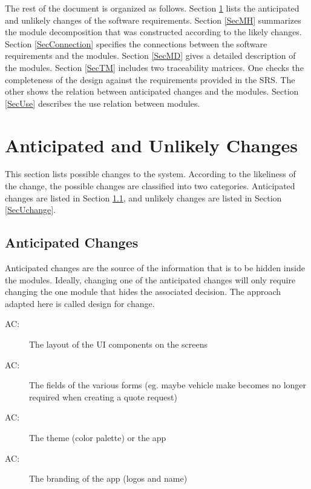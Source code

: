 \documentclass[12pt, titlepage]{article}
\newcounter{acnum}
\newcommand{\actheacnum}{AC\theacnum}
\begin{document}
The rest of the document is organized as follows. Section
\ref{SecChange} lists the anticipated and unlikely changes of the software
requirements. Section \ref{SecMH} summarizes the module decomposition that
was constructed according to the likely changes. Section \ref{SecConnection}
specifies the connections between the software requirements and the
modules. Section \ref{SecMD} gives a detailed description of the
modules. Section \ref{SecTM} includes two traceability matrices. One checks
the completeness of the design against the requirements provided in the SRS. The
other shows the relation between anticipated changes and the modules. Section
\ref{SecUse} describes the use relation between modules.

\section{Anticipated and Unlikely Changes} \label{SecChange}

This section lists possible changes to the system. According to the likeliness
of the change, the possible changes are classified into two
categories. Anticipated changes are listed in Section \ref{SecAchange}, and
unlikely changes are listed in Section \ref{SecUchange}.

\subsection{Anticipated Changes} \label{SecAchange}

Anticipated changes are the source of the information that is to be hidden
inside the modules. Ideally, changing one of the anticipated changes will only
require changing the one module that hides the associated decision. The approach
adapted here is called design for
change.

\begin{description}
\item[ \actheacnum \label{acLayout}:] The layout of the UI components on the
screens
\item[ \actheacnum \label{acInput}:] The fields of the various forms (eg. maybe vehicle make becomes no longer required when creating a quote request)
\item[ \actheacnum \label{acTheme}:] The theme (color palette) or the app
\item[ \actheacnum \label{acBrand}:] The branding of the app (logos and name)
\end{description}
\end{document}
